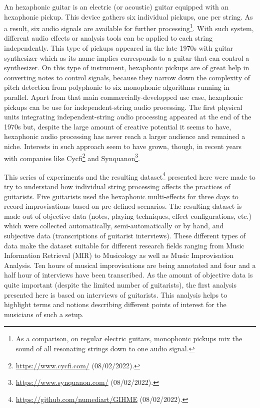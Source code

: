 \documentclass{article}
\begin{document}
An hexaphonic guitar is an electric (or acoustic) guitar equi\-pped with an hexaphonic pickup. This device gathers six individual pickups, one per string. As a result, six audio signals are available for further processing\footnote{As a comparison, on regular electric guitars, monophonic pickups mix the sound of all resonating strings down to one audio signal. }. With such system, different audio effects or analysis tools can be applied to each string independently. This type of pickups appeared in the late 1970s with guitar synthesizer which as its name implies corresponds to a guitar that can control a synthesizer. On this type of instrument, hexaphonic pickups are of great help in converting notes to control signals, because they narrow down the complexity of pitch detection from polyphonic to six monophonic algorithms running in parallel. Apart from that main commercially-developped use case, hexaphonic pickups can be use for independent-string audio processing. The first physical units integrating independent-string audio processing appeared at the end of the 1970s 
but, despite the large amount of creative potential it seems to have, hexaphonic audio processing has never reach a larger audience and remained a niche.  Interests in such approach seem to have grown, though, in recent years with companies like Cycfi\footnote{\url{https://www.cycfi.com/} (08/02/2022).} and Synquanon\footnote{\url{https://www.synquanon.com/} (08/02/2022).}.

This series of experiments and the resulting dataset\footnote{\url{https://github.com/numediart/GIHME} (08/02/2022).} presented here were made to try to understand how individual string processing affects the practices of guitarists.  Five guitarists used the hexaphonic multi-effects for three days to record improvisations based on pre-defined scenarios.
The resulting dataset is made out of objective data (notes, playing techniques, effect configurations, etc.) which were collected automatically, semi-automatically or by hand, and subjective data (transcriptions of guitarist interviews).  These different types of data make the dataset suitable for different research fields ranging from Music Information Retrieval (MIR) to Musicology as well as Music Improvisation Analysis. Ten hours of musical improvisations are being annotated and four and a half hour of interviews have been transcribed. As the amount of objective data is quite important (despite the limited number of guitarists), the first analysis presented here is based on interviews of guitarists. This analysis helps to highlight terms and notions describing different points of interest for the musicians of such a setup. 
\end{document}
